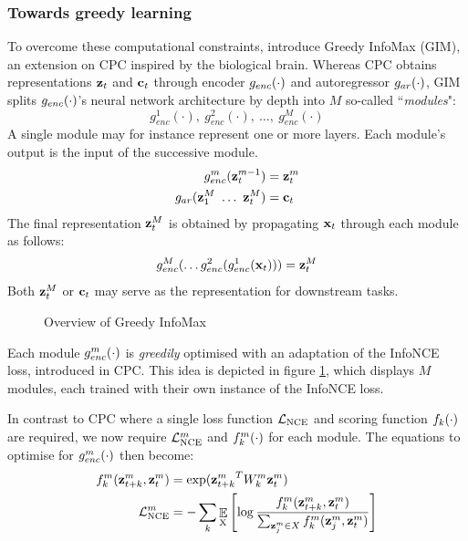 \subsubsection{Towards greedy learning}	
		To overcome these computational constraints, \cite{lowePuttingEndEndtoEnd2020a} introduce Greedy InfoMax (GIM), an extension on CPC inspired by the biological brain. Whereas CPC obtains representations $\mathbf{z}_t$ and $\mathbf{c}_t$ through encoder $g_{enc}(\cdot)$ and autoregressor $g_{ar}(\cdot)$, GIM splits $g_{enc}(\cdot)$'s neural network architecture by depth into $M$ so-called ``\textit{modules}": 
		$$g_{enc}^1(\cdot),~ g_{enc}^2(\cdot),~\dots,~g_{enc}^M(\cdot)$$ 
		A single module may for instance represent one or more layers. Each module's output is the input of the successive module.
		\begin{align*} %
			g_{enc}^m(\zt^{m-1}) &= \zt^m \\
			g_{ar}(\z_1^M ~ \dots ~ \zt^M) &= \ct
		\end{align*}
		The final representation $\mathbf{z}_t^M$ is obtained by propagating $\mathbf{x}_t$ through each module as follows:
		$$ g_{enc}^M ( \dots	g_{enc}^2(g_{enc}^1(\mathbf{x}_t))) = \mathbf{z}_t^M $$
		Both $\mathbf{z}_t^M$ or $\mathbf{c}_t$ may serve as the representation for downstream tasks.
	
	\begin{figure}[h!t]
		\hspace{2cm}
		
		\caption{Overview of Greedy InfoMax}
		\label{fig:gim-overview}
	\end{figure}


	
		Each module $g_{enc}^m(\cdot)$ is \textit{greedily} optimised with an adaptation of the InfoNCE loss, introduced in CPC. This idea is depicted in figure \ref{fig:gim-overview}, which displays $M$ modules, each trained with their own instance of the InfoNCE loss.
		
		In contrast to CPC where a single loss function $\mathcal{L}_{\text{NCE}}$ and scoring function $f_k(\cdot)$ are required, we now require $\mathcal{L}_{\text{NCE}}^m$ and $f_k^m(\cdot)$ for each module. The equations to optimise for $g_{enc}^m(\cdot)$ then become:
		\begin{align}
			f_k^m(\mathbf{z}_{t+k}^m,\mathbf{z}_t^m) &= \exp({\mathbf{z}_{t+k}^m}^TW_k^m\mathbf{z}_t^m) \label{eq:fkm} \\
			\mathcal{L}_{\text{NCE}}^m &= -\sum_{k} \mathop{\mathbb{E}}_{\substack{\textsubscript{X}}} \left[\log \frac{f_k^m({\mathbf{z}_{t+k}^m},{\mathbf{z}_t^m}) }{\sum_{\mathbf{z}_j^m \in X} f_k^m(\mathbf{z}_j^m, \mathbf{z}_t^m)} \right]	
		\end{align}
	
